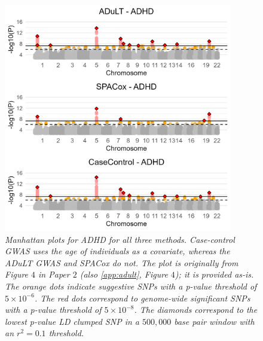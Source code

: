\begin{figure}[h] 
	\centering
	\includegraphics[width=10cm]{results/adult_manhattanPlot_ADHD}
	\caption[Manhattan plots from GWAS with the ADuLT phenotype, SPACox, and case-control status for ADHD]{
		\sl Manhattan plots for ADHD for all three methods. Case-control GWAS uses the age of individuals as a covariate, whereas the ADuLT GWAS and SPACox do not. The plot is originally from Figure $ 4 $ in Paper $ 2 $\cite{pedersen2022adult} (also \cref{app:adult}, Figure $ 4 $); it is provided as-is. The orange dots indicate suggestive SNPs with a p-value threshold of $ 5 \times 10^{-6} $. The red dots correspond to genome-wide significant SNPs with a p-value threshold of $ 5 \times 10^{-8} $. The diamonds correspond to the lowest p-value LD clumped SNP in a $ 500,000 $ base pair window with an $ r^2 = 0.1 $ threshold.}
	\label{fig:adult_ADHD}
\end{figure}

